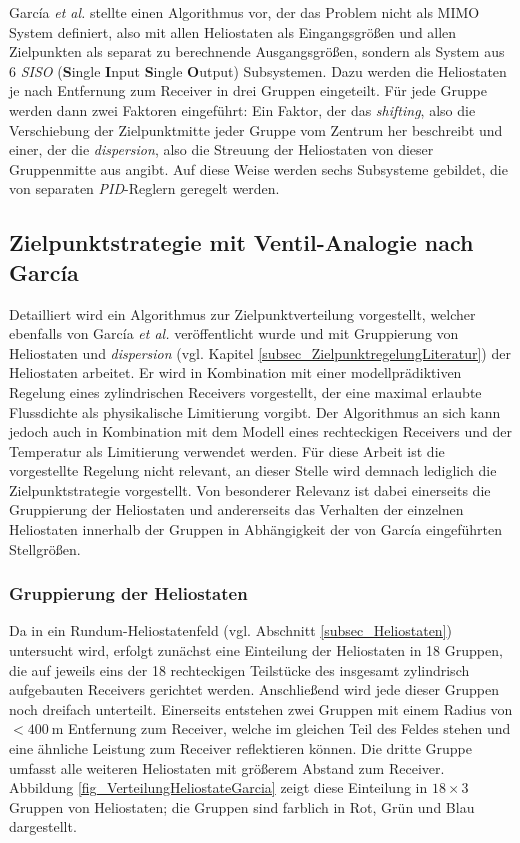 García \textit{et al.} \cite{Garcia1} stellte einen Algorithmus vor, der das Problem nicht als MIMO System definiert, also mit allen Heliostaten als Eingangsgrößen und allen Zielpunkten als separat zu berechnende Ausgangsgrößen, sondern als System aus 6 \textit{SISO} (\textbf{S}ingle \textbf{I}nput \textbf{S}ingle \textbf{O}utput) Subsystemen.
Dazu werden die Heliostaten je nach Entfernung zum Receiver in drei Gruppen eingeteilt.
Für jede Gruppe werden dann zwei Faktoren eingeführt: Ein Faktor, der das \textit{shifting}, also die Verschiebung der Zielpunktmitte jeder Gruppe vom Zentrum her beschreibt und einer, der die \textit{dispersion}, also die Streuung der Heliostaten von dieser Gruppenmitte aus angibt.
Auf diese Weise werden sechs Subsysteme gebildet, die von separaten \textit{PID}-Reglern geregelt werden.


\subsection{Zielpunktstrategie mit Ventil-Analogie nach García} \label{subsec_ZielpunktregelungGarcia}
Detailliert wird ein Algorithmus zur Zielpunktverteilung vorgestellt, welcher ebenfalls von García \textit{et al.} \cite{Garcia2} veröffentlicht wurde und mit Gruppierung von Heliostaten und \textit{dispersion} (vgl. Kapitel \ref{subsec_ZielpunktregelungLiteratur}) der Heliostaten arbeitet.
Er wird in Kombination mit einer modellprädiktiven Regelung eines zylindrischen Receivers vorgestellt, der eine maximal erlaubte Flussdichte als physikalische Limitierung vorgibt.
Der Algorithmus an sich kann jedoch auch in Kombination mit dem Modell eines rechteckigen Receivers und der Temperatur als Limitierung verwendet werden.
Für diese Arbeit ist die vorgestellte Regelung nicht relevant, an dieser Stelle wird demnach lediglich die Zielpunktstrategie vorgestellt.
Von besonderer Relevanz ist dabei einerseits die Gruppierung der Heliostaten und andererseits das Verhalten der einzelnen Heliostaten innerhalb der Gruppen in Abhängigkeit der von García eingeführten Stellgrößen.

\subsubsection*{Gruppierung der Heliostaten} \label{subsubsec_Gruppierung}
Da in \cite{Garcia2} ein Rundum-Heliostatenfeld (vgl. Abschnitt \ref{subsec_Heliostaten}) untersucht wird, erfolgt zunächst eine Einteilung der Heliostaten in 18 Gruppen, die auf jeweils eins der 18 rechteckigen Teilstücke des insgesamt zylindrisch aufgebauten Receivers gerichtet werden.
Anschließend wird jede dieser Gruppen noch dreifach unterteilt.
Einerseits entstehen zwei Gruppen mit einem Radius von $<\SI{400}{\metre}$ Entfernung zum Receiver, welche im gleichen Teil des Feldes stehen und eine ähnliche Leistung zum Receiver reflektieren können.
Die dritte Gruppe umfasst alle weiteren Heliostaten mit größerem Abstand zum Receiver. \cite[S.8-10]{Garcia2}\\
Abbildung \ref{fig_VerteilungHeliostateGarcia} zeigt diese Einteilung in $18 \times 3$ Gruppen von Heliostaten; die Gruppen sind farblich in Rot, Grün und Blau dargestellt.

